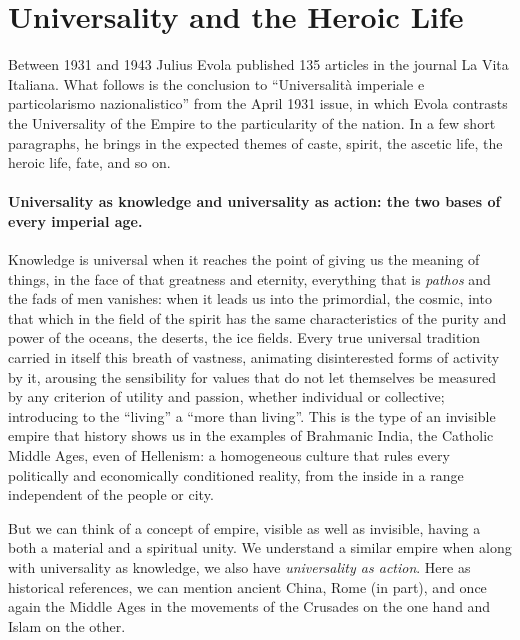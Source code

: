 \section{Universality and the Heroic Life}

\begin{quotex}
Between 1931 and 1943 Julius Evola published 135 articles in the journal La Vita Italiana. What follows is the conclusion to ``Universalità imperiale e particolarismo nazionalistico'' from the April 1931 issue, in which Evola contrasts the Universality of the Empire to the particularity of the nation. In a few short paragraphs, he brings in the expected themes of caste, spirit, the ascetic life, the heroic life, fate, and so on.
\end{quotex}


\paragraph{Universality as knowledge and universality as action: the two bases of every imperial age.}


Knowledge is universal when it reaches the point of giving us the meaning of things, in the face of that greatness and eternity, everything that is \emph{pathos} and the fads of men vanishes: when it leads us into the primordial, the cosmic, into that which in the field of the spirit has the same characteristics of the purity and power of the oceans, the deserts, the ice fields. Every true universal tradition carried in itself this breath of vastness, animating disinterested forms of activity by it, arousing the sensibility for values that do not let themselves be measured by any criterion of utility and passion, whether individual or collective; introducing to the ``living'' a ``more than living''. This is the type of an invisible empire that history shows us in the examples of Brahmanic India, the Catholic Middle Ages, even of Hellenism: a homogeneous culture that rules every politically and economically conditioned reality, from the inside in a range independent of the people or city.

But we can think of a concept of empire, visible as well as invisible, having a both a material and a spiritual unity. We understand a similar empire when along with universality as knowledge, we also have \emph{universality as action}. Here as historical references, we can mention ancient China, Rome (in part), and once again the Middle Ages in the movements of the Crusades on the one hand and Islam on the other.

